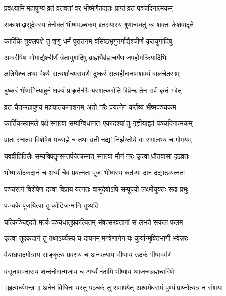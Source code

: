\twolineshloka
{प्रवक्ष्यामि महापुण्यं व्रतं व्रतवतां वर}
{भीष्मेणैतद्यतः प्राप्तं व्रतं पञ्चदिनात्मकम्} %

\twolineshloka
{सकाशाद्वासुदेवस्य तेनोक्तं भीष्मपञ्चकम्}
{व्रतस्यास्य गुणान्वक्तुं कः शक्तः केशवादृते} %

\twolineshloka
{कार्तिके शुक्लपक्षे तु शृणु धर्मं पुरातनम्}
{वसिष्ठभृगुगर्गाद्यैश्चीर्णं कृतयुगादिषु} %

\twolineshloka
{अम्बरीषेण भोगाद्यैश्चीर्णं त्रेतायुगादिषु}
{ब्राह्मणैर्ब्रह्मचर्येण जपहोमक्रियादिभिः} %

\twolineshloka
{क्षत्रियैश्च तथा वैश्यैः सत्यशौचपरायणैः}
{दुष्करं सत्यहीनानामशक्यं बालचेतसाम्} %

\twolineshloka
{दुष्करं भीष्ममित्याहुर्न शक्यं प्राकृतैर्नरैः}
{यस्मात्करोति विप्रेन्द्र तेन सर्वं कृतं भवेत्} %

\twolineshloka
{व्रतं चैतन्महापुण्यं महापातकनाशनम्}
{अतो नरैः प्रयत्नेन कर्तव्यं भीष्मपञ्चकम्} %

\twolineshloka
{कार्तिकस्यामले पक्षे स्नात्वा सम्यग्विधानतः}
{एकादश्यां तु गृह्णीयाद्व्रतं पञ्चदिनात्मकम्} %

\twolineshloka
{प्रातः स्नात्वा विशेषेण मध्याह्ने च तथा व्रती}
{नद्यां निर्झरतोये वा समालभ्य च गोमयम्} %

\twolineshloka
{यवव्रीहितिलैः सम्यक्पितॄन्सन्तर्पयेत्क्रमात्}
{स्नात्वा मौनं नरः कृत्वा धौतवासा दृढव्रतः} %

\twolineshloka
{भीष्मायोदकदानं च अर्घ्यं चैव प्रयत्नतः}
{पूजा भीष्मस्य कर्तव्या दानं दद्यात्प्रयत्नतः} %

\twolineshloka
{पञ्चरत्नं विशेषेण दत्त्वा विप्राय यत्नतः}
{वासुदेवोऽपि सम्पूज्यो लक्ष्मीयुक्तः सदा प्रभुः} %


\onelineshloka
{पञ्चके पूजयित्वा तु कोटिजन्मानि तुष्यति} %

\twolineshloka
{यत्किञ्चिद्ददते मर्त्यः पञ्चधातुप्रकल्पितम्}
{संवत्सरव्रतानां स लभते सकलं फलम्} %

\twolineshloka
{कृत्वा तूदकदानं तु तथाऽर्घ्यस्य च दापनम्}
{मन्त्रेणानेन यः कुर्यान्मुक्तिभागी भवेन्नरः} %

\twolineshloka
{वैयाघ्रपादगोत्राय साङ्कृत्य प्रवराय च}
{अनपत्याय भीष्माय उदकं भीष्मवर्मणे} %

\twolineshloka
{वसूनामवताराय शन्तनोरात्मजाय च}
{अर्घ्यं ददामि भीष्माय आजन्मब्रह्मचारिणे} %


॥इत्यर्घ्यमन्त्रः॥
\twolineshloka
{अनेन विधिना यस्तु पञ्चकं तु समापयेत्}
{अश्वमेधसमं पुण्यं प्राप्नोत्यत्र न संशयः} %

